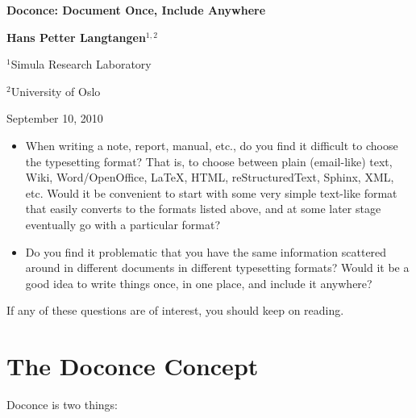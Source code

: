 \documentclass{article}
\begin{document}
\begin{center}
{\LARGE\bf Doconce: Document Once, Include Anywhere}
\end{center}



\begin{center}
{\bf Hans Petter Langtangen${}^{1, 2}$} \\ [0mm]
\end{center}

\begin{center}
{\small ${}^1$Simula Research Laboratory} \\ [-1.0mm]
\end{center}

\begin{center}
{\small ${}^2$University of Oslo} \\ [-1.0mm]
\end{center}





\begin{center}
September 10, 2010
\end{center}


\begin{itemize}
 \item When writing a note, report, manual, etc., do you find it difficult
   to choose the typesetting format? That is, to choose between plain
   (email-like) text, Wiki, Word/OpenOffice, {\LaTeX}, HTML,
   reStructuredText, Sphinx, XML, etc.  Would it be convenient to
   start with some very simple text-like format that easily converts
   to the formats listed above, and at some later stage eventually go
   with a particular format?

 \item Do you find it problematic that you have the same information
   scattered around in different documents in different typesetting
   formats? Would it be a good idea to write things once, in one
   place, and include it anywhere?
\end{itemize}

\noindent
If any of these questions are of interest, you should keep on reading.


\section{The Doconce Concept}

Doconce is two things:
\end{document}
